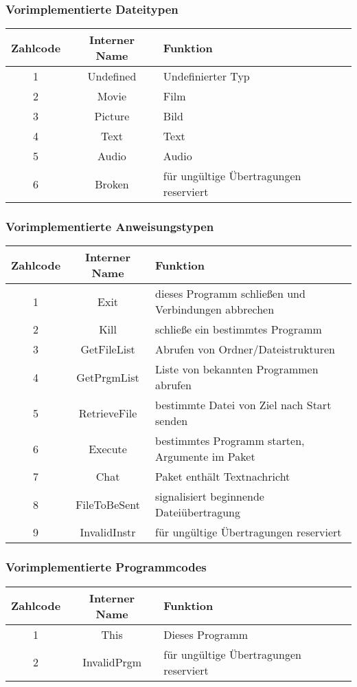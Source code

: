 \subsubsection*{Vorimplementierte Dateitypen}
\begin{tabular}{|c|c|l|}
\hline
Zahlcode & Interner Name & Funktion\\\hline
1 & Undefined & Undefinierter Typ\\\hline
2 & Movie & Film\\\hline
3 & Picture & Bild\\\hline
4 & Text & Text\\\hline
5 & Audio & Audio\\\hline
6 & Broken & für ungültige Übertragungen reserviert\\\hline
\end{tabular}

\subsubsection*{Vorimplementierte Anweisungstypen}
\begin{tabular}{|c|c|l|}
\hline
Zahlcode & Interner Name & Funktion\\\hline
1&    Exit           & dieses Programm schließen und Verbindungen abbrechen\\\hline
2&    Kill           & schließe ein bestimmtes Programm\\\hline
3&    GetFileList    & Abrufen von Ordner/Dateistrukturen\\\hline
4&    GetPrgmList    & Liste von bekannten Programmen abrufen\\\hline
5&    RetrieveFile   & bestimmte Datei von Ziel nach Start senden\\\hline
6&    Execute        & bestimmtes Programm starten, Argumente im Paket\\\hline
7&    Chat           & Paket enthält Textnachricht\\\hline
8&    FileToBeSent   & signalisiert beginnende Dateiübertragung\\\hline
9&    InvalidInstr   & für ungültige Übertragungen reserviert\\\hline
\end{tabular}

\subsubsection*{Vorimplementierte Programmcodes}
\begin{tabular}{|c|c|l|}
\hline
Zahlcode & Interner Name & Funktion\\\hline
1 & This & Dieses Programm\\\hline
2 & InvalidPrgm & für ungültige Übertragungen reserviert\\\hline
\end{tabular}